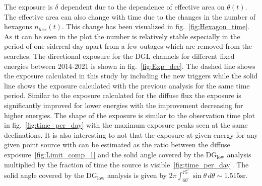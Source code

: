 The exposure is $\delta$ dependent due to the dependence of effective area on $\theta(t)$. The effective area can also change with time due to the changes in the number of hexagons $n_{hex}(t)$. This change has been visualized in fig.~\ref{fig:Hexagon_time}. As it can be seen in the plot the number is relatively stable especially in the period of one sidereal day apart from a few outages which are removed from the searches. The directional exposure for the DGL channels for different fixed energies between 2014-2021 is shown in fig.~\ref{fig:Exp_dec}. The dashed line shows the exposure calculated in this study by including the new triggers while the solid line shows the exposure calculated with the previous analysis for the same time period. Similar to the exposure calculated for the diffuse flux the exposure is significantly improved for lower energies with the improvement decreasing for higher energies. The shape of the exposure is similar to the observation time plot in fig.~\ref{fig:time_per_day} with the maximum exposure peaks seen at the same declinations. It is also interesting to not that the exposure at given energy for any given point source with  can be estimated as the ratio between the diffuse exposure~\ref{fig:Limit_comp_1} and the solid angle covered by the DG$_{\text{low}}$ analysis multiplied by the fraction of time the source is visible~\ref{fig:time_per_day}. The solid angle covered by the DG$_{\text{low}}$ analysis is given by $2\pi \int_{60^{\circ}}^{75^{\circ}} \sin \theta \,d \theta \sim 1.515 \text{sr}$.


